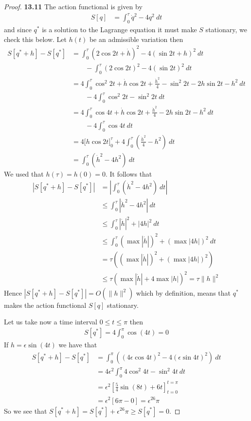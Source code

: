 \documentclass[11pt]{article}
\theoremstyle{definition}
\begin{document}
\begin{proof}{\textbf{13.11}}
    The action functional is given by
    \begin{align*}
        S[q] &= \int_0^\tau \dot{q}^2 - 4q^2~dt
    \end{align*}
    and since $q^*$ is a solution to the Lagrange equation it must make $S$
    stationary, we check this below. Let $h(t)$ be an admissible variation then 
    \begin{align*}
        S[q^* + h] - S[q^*] 
        &= \int_0^\tau (2\cos 2t + \dot h)^2 - 4(\sin 2t + h)^2~dt\\
        &\quad\quad- \int_0^\tau (2\cos 2t)^2 - 4(\sin 2t)^2~dt\\
        &= 4\int_0^\tau \cos^2 2t + \dot h\cos 2t + \frac{\dot h^2}{4}
        - \sin^2 2t  - 2h\sin 2t - h^2~dt\\
        &\quad\quad- 4\int_0^\tau \cos^2 2t - \sin^2 2t~dt\\
        &= 4\int_0^\tau \cos 4t + \dot h\cos 2t + \frac{\dot h^2}{4}
        - 2h\sin 2t - h^2~dt\\
        &\quad\quad- 4\int_0^\tau \cos 4t~dt\\
        &= 4\bigg[h\cos 2t\bigg]_{0}^\tau
        + 4\int_0^\tau \left(\frac{\dot h^2}{4} - h^2 \right)~dt\\
        &= \int_0^\tau \left(\dot h^2 - 4h^2 \right)~dt
    \end{align*}
    We used that $h(\tau) = h(0) = 0$. It follows that
    \begin{align*}
        \left|S[q^* + h] - S[q^*]\right|
        &= \left|\int_0^\tau \left(\dot h^2 - 4h^2 \right)~dt\right|\\
        &\leq  \int_0^\tau \left|\dot h^2 - 4h^2 \right|~dt\\
        &\leq  \int_0^\tau |\dot h|^2 + |4h|^2~dt\\
        &\leq  \int_0^\tau (\max|\dot h|)^2 + (\max|4h|)^2~dt\\
        &= \tau((\max|\dot h|)^2 + (\max|4h|)^2)\\
        &\leq \tau(\max|\dot h| + 4\max|h|)^2 = \tau\|h\|^2
    \end{align*}
    Hence $\left|S[q^* + h] - S[q^*]\right| = O(\|h\|^2)$ which by definition,
    means that $q^*$ makes the action functional $S[q]$ stationary.

    Let us take now a time interval $0 \leq t \leq \pi$ then
    \begin{align*}
        S[q^*] = 4 \int_0^\pi \cos(4t) = 0
    \end{align*}
    If $h = \epsilon \sin(4t)$ we have that
    \begin{align*}
        S[q^* + h] - S[q^*] 
        &= \int_0^\pi \left((4\epsilon\cos 4t)^2 - 4(\epsilon\sin 4t)^2 \right)~dt\\
        &= 4\epsilon^2\int_0^\pi 4\cos^2 4t - \sin^2 4t~dt\\
        &= \epsilon^2\left[\frac{5}{4}\sin(8t) + 6t\right]_{t=0}^{t=\pi}\\
        &= \epsilon^2[6\pi - 0] = \epsilon^26\pi
    \end{align*}
    So we see that $S[q^* + h] = S[q^*] + \epsilon^26\pi \geq S[q^*] = 0$.


\end{proof}
\end{document}
